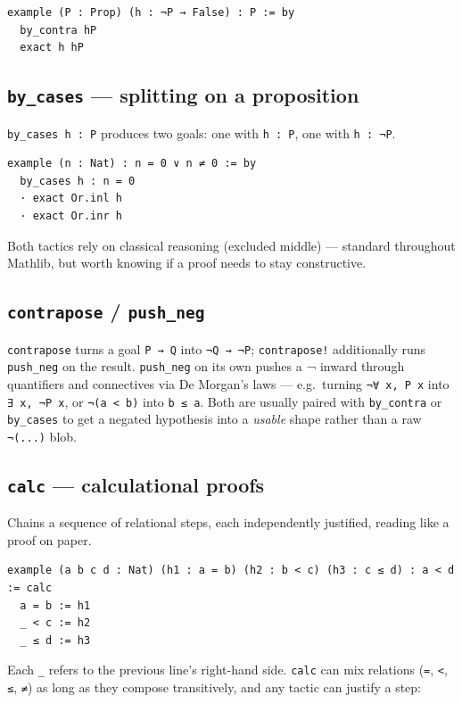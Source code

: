 \begin{verbatim}
example (P : Prop) (h : ¬P → False) : P := by
  by_contra hP
  exact h hP
\end{verbatim}

\subsection{\texttt{by\_cases} --- splitting on a proposition}

\texttt{by\_cases h : P} produces two goals: one with \texttt{h : P}, one with \texttt{h : ¬P}.

\begin{verbatim}
example (n : Nat) : n = 0 ∨ n ≠ 0 := by
  by_cases h : n = 0
  · exact Or.inl h
  · exact Or.inr h
\end{verbatim}

Both tactics rely on classical reasoning (excluded middle) --- standard throughout Mathlib, but worth knowing if a proof needs to stay constructive.

\subsection{\texttt{contrapose} / \texttt{push\_neg}}

\texttt{contrapose} turns a goal \texttt{P → Q} into \texttt{¬Q → ¬P}; \texttt{contrapose!} additionally runs \texttt{push\_neg} on the result. \texttt{push\_neg} on its own pushes a ¬ inward through quantifiers and connectives via De Morgan's laws --- e.g.\ turning \texttt{¬∀ x, P x} into \texttt{∃ x, ¬P x}, or \texttt{¬(a < b)} into \texttt{b ≤ a}. Both are usually paired with \texttt{by\_contra} or \texttt{by\_cases} to get a negated hypothesis into a \emph{usable} shape rather than a raw \texttt{¬(...)} blob.

\subsection{\texttt{calc} --- calculational proofs}

Chains a sequence of relational steps, each independently justified, reading like a proof on paper.

\begin{verbatim}
example (a b c d : Nat) (h1 : a = b) (h2 : b < c) (h3 : c ≤ d) : a < d := calc
  a = b := h1
  _ < c := h2
  _ ≤ d := h3
\end{verbatim}

Each \texttt{\_} refers to the previous line's right-hand side. \texttt{calc} can mix relations (\texttt{=}, \texttt{<}, \texttt{≤}, \texttt{≠}) as long as they compose transitively, and any tactic can justify a step:

